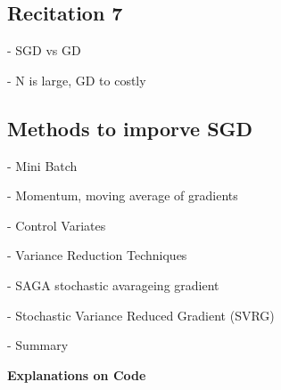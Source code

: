 \subsection{Recitation 7}

- SGD vs GD

- N is large, GD to costly

\subsection{Methods to imporve SGD}

- Mini Batch

- Momentum, moving average of gradients

- Control Variates

- Variance Reduction Techniques

- SAGA stochastic avarageing gradient

- Stochastic Variance Reduced Gradient (SVRG)

- Summary

\textbf{Explanations on Code}
